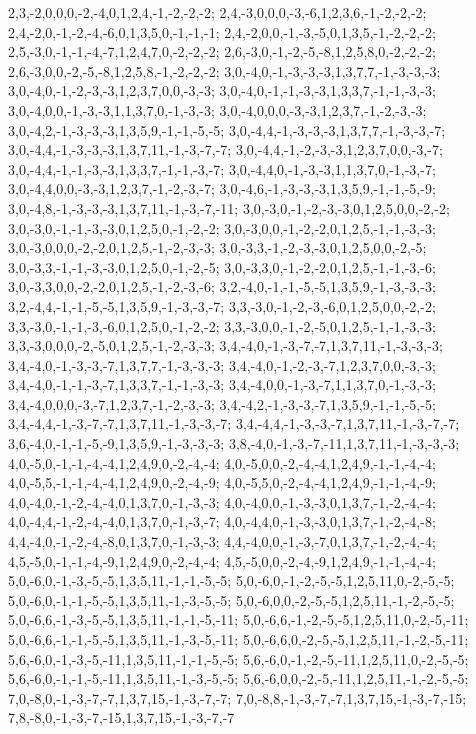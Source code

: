 {{2,3,-2,0,0,0,-2,-4,0,1,2,4,-1,-2,-2,-2; 2,4,-3,0,0,0,-3,-6,1,2,3,6,-1,-2,-2,-2; 2,4,-2,0,-1,-2,-4,-6,0,1,3,5,0,-1,-1,-1; 2,4,-2,0,0,-1,-3,-5,0,1,3,5,-1,-2,-2,-2; 2,5,-3,0,-1,-1,-4,-7,1,2,4,7,0,-2,-2,-2; 2,6,-3,0,-1,-2,-5,-8,1,2,5,8,0,-2,-2,-2; 2,6,-3,0,0,-2,-5,-8,1,2,5,8,-1,-2,-2,-2; 3,0,-4,0,-1,-3,-3,-3,1,3,7,7,-1,-3,-3,-3; 3,0,-4,0,-1,-2,-3,-3,1,2,3,7,0,0,-3,-3; 3,0,-4,0,-1,-1,-3,-3,1,3,3,7,-1,-1,-3,-3; 3,0,-4,0,0,-1,-3,-3,1,1,3,7,0,-1,-3,-3; 3,0,-4,0,0,0,-3,-3,1,2,3,7,-1,-2,-3,-3;
3,0,-4,2,-1,-3,-3,-3,1,3,5,9,-1,-1,-5,-5; 3,0,-4,4,-1,-3,-3,-3,1,3,7,7,-1,-3,-3,-7; 3,0,-4,4,-1,-3,-3,-3,1,3,7,11,-1,-3,-7,-7; 3,0,-4,4,-1,-2,-3,-3,1,2,3,7,0,0,-3,-7; 3,0,-4,4,-1,-1,-3,-3,1,3,3,7,-1,-1,-3,-7; 3,0,-4,4,0,-1,-3,-3,1,1,3,7,0,-1,-3,-7; 3,0,-4,4,0,0,-3,-3,1,2,3,7,-1,-2,-3,-7; 3,0,-4,6,-1,-3,-3,-3,1,3,5,9,-1,-1,-5,-9; 3,0,-4,8,-1,-3,-3,-3,1,3,7,11,-1,-3,-7,-11; 3,0,-3,0,-1,-2,-3,-3,0,1,2,5,0,0,-2,-2; 3,0,-3,0,-1,-1,-3,-3,0,1,2,5,0,-1,-2,-2; 3,0,-3,0,0,-1,-2,-2,0,1,2,5,-1,-1,-3,-3;
3,0,-3,0,0,0,-2,-2,0,1,2,5,-1,-2,-3,-3; 3,0,-3,3,-1,-2,-3,-3,0,1,2,5,0,0,-2,-5; 3,0,-3,3,-1,-1,-3,-3,0,1,2,5,0,-1,-2,-5; 3,0,-3,3,0,-1,-2,-2,0,1,2,5,-1,-1,-3,-6; 3,0,-3,3,0,0,-2,-2,0,1,2,5,-1,-2,-3,-6; 3,2,-4,0,-1,-1,-5,-5,1,3,5,9,-1,-3,-3,-3; 3,2,-4,4,-1,-1,-5,-5,1,3,5,9,-1,-3,-3,-7; 3,3,-3,0,-1,-2,-3,-6,0,1,2,5,0,0,-2,-2; 3,3,-3,0,-1,-1,-3,-6,0,1,2,5,0,-1,-2,-2; 3,3,-3,0,0,-1,-2,-5,0,1,2,5,-1,-1,-3,-3; 3,3,-3,0,0,0,-2,-5,0,1,2,5,-1,-2,-3,-3; 3,4,-4,0,-1,-3,-7,-7,1,3,7,11,-1,-3,-3,-3;
3,4,-4,0,-1,-3,-3,-7,1,3,7,7,-1,-3,-3,-3; 3,4,-4,0,-1,-2,-3,-7,1,2,3,7,0,0,-3,-3; 3,4,-4,0,-1,-1,-3,-7,1,3,3,7,-1,-1,-3,-3; 3,4,-4,0,0,-1,-3,-7,1,1,3,7,0,-1,-3,-3; 3,4,-4,0,0,0,-3,-7,1,2,3,7,-1,-2,-3,-3; 3,4,-4,2,-1,-3,-3,-7,1,3,5,9,-1,-1,-5,-5; 3,4,-4,4,-1,-3,-7,-7,1,3,7,11,-1,-3,-3,-7; 3,4,-4,4,-1,-3,-3,-7,1,3,7,11,-1,-3,-7,-7; 3,6,-4,0,-1,-1,-5,-9,1,3,5,9,-1,-3,-3,-3; 3,8,-4,0,-1,-3,-7,-11,1,3,7,11,-1,-3,-3,-3; 4,0,-5,0,-1,-1,-4,-4,1,2,4,9,0,-2,-4,-4; 4,0,-5,0,0,-2,-4,-4,1,2,4,9,-1,-1,-4,-4;
4,0,-5,5,-1,-1,-4,-4,1,2,4,9,0,-2,-4,-9; 4,0,-5,5,0,-2,-4,-4,1,2,4,9,-1,-1,-4,-9; 4,0,-4,0,-1,-2,-4,-4,0,1,3,7,0,-1,-3,-3; 4,0,-4,0,0,-1,-3,-3,0,1,3,7,-1,-2,-4,-4; 4,0,-4,4,-1,-2,-4,-4,0,1,3,7,0,-1,-3,-7; 4,0,-4,4,0,-1,-3,-3,0,1,3,7,-1,-2,-4,-8; 4,4,-4,0,-1,-2,-4,-8,0,1,3,7,0,-1,-3,-3; 4,4,-4,0,0,-1,-3,-7,0,1,3,7,-1,-2,-4,-4; 4,5,-5,0,-1,-1,-4,-9,1,2,4,9,0,-2,-4,-4; 4,5,-5,0,0,-2,-4,-9,1,2,4,9,-1,-1,-4,-4; 5,0,-6,0,-1,-3,-5,-5,1,3,5,11,-1,-1,-5,-5; 5,0,-6,0,-1,-2,-5,-5,1,2,5,11,0,-2,-5,-5;
5,0,-6,0,-1,-1,-5,-5,1,3,5,11,-1,-3,-5,-5; 5,0,-6,0,0,-2,-5,-5,1,2,5,11,-1,-2,-5,-5; 5,0,-6,6,-1,-3,-5,-5,1,3,5,11,-1,-1,-5,-11; 5,0,-6,6,-1,-2,-5,-5,1,2,5,11,0,-2,-5,-11; 5,0,-6,6,-1,-1,-5,-5,1,3,5,11,-1,-3,-5,-11; 5,0,-6,6,0,-2,-5,-5,1,2,5,11,-1,-2,-5,-11; 5,6,-6,0,-1,-3,-5,-11,1,3,5,11,-1,-1,-5,-5; 5,6,-6,0,-1,-2,-5,-11,1,2,5,11,0,-2,-5,-5; 5,6,-6,0,-1,-1,-5,-11,1,3,5,11,-1,-3,-5,-5; 5,6,-6,0,0,-2,-5,-11,1,2,5,11,-1,-2,-5,-5; 7,0,-8,0,-1,-3,-7,-7,1,3,7,15,-1,-3,-7,-7; 7,0,-8,8,-1,-3,-7,-7,1,3,7,15,-1,-3,-7,-15;
7,8,-8,0,-1,-3,-7,-15,1,3,7,15,-1,-3,-7,-7}\par
}

